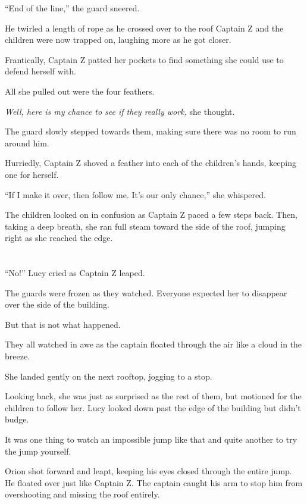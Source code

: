 \documentclass[12pt]{extbook}
\begin{document}
  \enquote{End of the line,} the guard sneered.
  
  He twirled a length of rope as he crossed over to the roof Captain Z and
  the children were now trapped on, laughing more as he got closer.
  
  Frantically, Captain Z patted her pockets to find something she could
  use to defend herself with.
  
  All she pulled out were the four feathers.
  
  \emph{Well, here is my chance to see if they really work,} she thought.
  
  The guard slowly stepped towards them, making sure there was no room to
  run around him.
  
  Hurriedly, Captain Z shoved a feather into each of the children's hands,
  keeping one for herself.
  
  \enquote{If I make it over, then follow me. It's our only chance,} she
  whispered.
  
  The children looked on in confusion as Captain Z paced a few steps back.
  Then, taking a deep breath, she ran full steam toward the side of the
  roof, jumping right as she reached the edge.
  
  \section{}\label{section-34}
  
  \enquote{No!} Lucy cried as Captain Z leaped.
  
  The guards were frozen as they watched. Everyone expected her to
  disappear over the side of the building.
  
  But that is not what happened.
  
  They all watched in awe as the captain floated through the air like a
  cloud in the breeze.
  
  She landed gently on the next rooftop, jogging to a stop.
  
  Looking back, she was just as surprised as the rest of them, but
  motioned for the children to follow her. Lucy looked down past the edge
  of the building but didn't budge.
  
  It was one thing to watch an impossible jump like that and quite another
  to try the jump yourself.
  
  Orion shot forward and leapt, keeping his eyes closed through the entire
  jump. He floated over just like Captain Z. The captain caught his arm to
  stop him from overshooting and missing the roof entirely.
  
\end{document}
